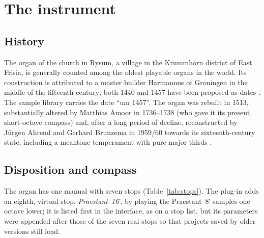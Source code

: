 \documentclass[11pt,a4paper,parskip=half,DIV=11,toc=bibliography]{scrartcl}
\begin{document}
\section{The instrument}
\label{sec:instrument}

\subsection{History}
The organ of the church in Rysum, a village in the Krummhörn district of East Frisia, is generally
counted among the oldest playable organs in the world. Its construction is attributed to a
master builder Harmannus of Groningen in the middle of the fifteenth century; both 1440 and 1457
have been proposed as dates \citep{wiki_rysum}. The sample library carries the date
\enquote{um 1457}. The organ was rebuilt in 1513, substantially altered by Matthias Amoor in
1736--1738 (who gave it its present short-octave compass) and, after a long period of decline,
reconstructed by Jürgen Ahrend and Gerhard Brunzema in 1959/60 towards its sixteenth-century state,
including a meantone temperament with pure major thirds \citep{wiki_rysum}.

\subsection{Disposition and compass}
The organ has one manual with seven stops (Table~\ref{tab:stops}). The plug-in adds an eighth,
virtual stop, \emph{Praestant~16′}, by playing the Praestant~8′ samples one octave lower; it is listed
first in the interface, as on a stop list, but its parameters were appended after those of the
seven real stops so that projects saved by older versions still load.
\end{document}
